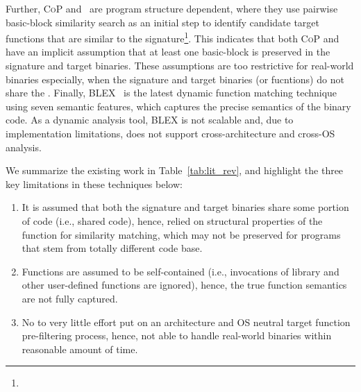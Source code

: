 Further, \textsc{\small CoP} and~\cite{DBLP:conf/sp/PewnyGGRH15} are program structure dependent, where they use pairwise basic-block similarity search as an initial step to identify candidate target functions that are similar to the signature\footnote{}. This indicates that both \textsc{\small CoP} and~\cite{DBLP:conf/sp/PewnyGGRH15} have an implicit assumption that at least one basic-block is preserved in the signature and target binaries. These assumptions are too restrictive for real-world binaries especially, when the signature and target binaries (or fucntions) do not share the . Finally, \textsc{\small BLEX}~\cite{egele2014blanket} is the latest dynamic function matching technique using seven semantic features, which captures the precise semantics of the binary code. As a dynamic analysis tool, \textsc{\small BLEX} %
is not scalable and, due to implementation limitations, does not support cross-architecture and cross-OS analysis.

We summarize the existing work in Table~\ref{tab:lit_rev}, and highlight the three key limitations in these techniques below:
\renewcommand{\theenumi}{\arabic{enumi}}
\begin{enumerate}[label=\textbf{P\theenumi.},itemindent=*,itemsep=0.15mm]
\itemsep0em
\item It is assumed that both the signature and target binaries share some portion of code (i.e., shared code), hence, relied on structural properties of the function for similarity matching, which may not be preserved for programs that stem from totally different code base.
\item Functions are assumed to be self-contained (i.e., invocations of library and other user-defined functions are ignored), hence, the true function semantics are not fully captured.
\item No to very little effort put on an architecture and OS neutral target function pre-filtering process, hence, not able to handle real-world binaries within reasonable amount of time.
\end{enumerate}

